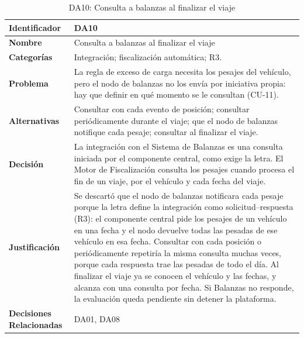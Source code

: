 \begin{table}[H]
    \small
    \centering
    \caption{DA10: Consulta a balanzas al finalizar el viaje}
    \label{tab:da10}
    \begin{tabular}{|p{4.1cm}|p{11.7cm}|}
        \hline
            \textbf{Identificador} & DA10 \\
        \hline
            \textbf{Nombre} & Consulta a balanzas al finalizar el viaje \\
        \hline
            \textbf{Categorías} & Integración; fiscalización automática; R3. \\
        \hline
            \textbf{Problema} & La regla de exceso de carga necesita los pesajes del vehículo, pero el nodo de balanzas no los envía por iniciativa propia: hay que definir en qué momento se le consultan (CU-11). \\
        \hline
            \textbf{Alternativas} & Consultar con cada evento de posición; consultar periódicamente durante el viaje; que el nodo de balanzas notifique cada pesaje; consultar al finalizar el viaje. \\
        \hline
            \textbf{Decisión} & La integración con el Sistema de Balanzas es una consulta iniciada por el componente central, como exige la letra. El Motor de Fiscalización consulta los pesajes cuando procesa el fin de un viaje, por el vehículo y cada fecha del viaje. \\
        \hline
            \textbf{Justificación} & Se descartó que el nodo de balanzas notificara cada pesaje porque la letra define la integración como solicitud--respuesta (R3): el componente central pide los pesajes de un vehículo en una fecha y el nodo devuelve todas las pesadas de ese vehículo en esa fecha. Consultar con cada posición o periódicamente repetiría la misma consulta muchas veces, porque cada respuesta trae las pesadas de todo el día. Al finalizar el viaje ya se conocen el vehículo y las fechas, y alcanza con una consulta por fecha. Si Balanzas no responde, la evaluación queda pendiente sin detener la plataforma. \\
        \hline
            \textbf{Decisiones Relacionadas} & DA01, DA08 \\
        \hline
    \end{tabular}
\end{table}

